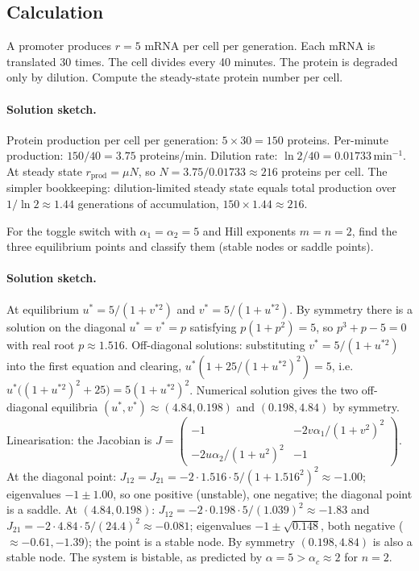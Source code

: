 \subsection*{Calculation}

\begin{exercise}
A promoter produces $r = 5$ mRNA per cell per generation. Each mRNA
is translated $30$ times. The cell divides every 40 minutes. The
protein is degraded only by dilution. Compute the steady-state
protein number per cell.

\paragraph{Solution sketch.}
Protein production per cell per generation: $5 \times 30 = 150$
proteins. Per-minute production: $150/40 = 3.75$ proteins/min.
Dilution rate: $\ln 2 / 40 = 0.01733\,\text{min}^{-1}$. At
steady state $r_{\text{prod}} = \mu N$, so $N = 3.75/0.01733 \approx
216$ proteins per cell. The simpler bookkeeping: dilution-limited
steady state equals total production over $1/\ln 2 \approx 1.44$
generations of accumulation, $150 \times 1.44 \approx 216$.
\end{exercise}

\begin{exercise}
For the toggle switch with $\alpha_1 = \alpha_2 = 5$ and Hill
exponents $m = n = 2$, find the three equilibrium points and
classify them (stable nodes or saddle points).

\paragraph{Solution sketch.}
At equilibrium $u^{*} = 5/(1+v^{*2})$ and $v^{*} = 5/(1+u^{*2})$.
By symmetry there is a solution on the diagonal $u^{*} = v^{*} = p$
satisfying $p(1+p^{2}) = 5$, so $p^{3} + p - 5 = 0$ with real
root $p \approx 1.516$. Off-diagonal solutions: substituting
$v^{*} = 5/(1+u^{*2})$ into the first equation and clearing,
$u^{*}(1 + 25/(1+u^{*2})^{2}) = 5$, i.e.\
$u^{*}\big((1+u^{*2})^{2} + 25\big) = 5(1+u^{*2})^{2}$. Numerical
solution gives the two off-diagonal equilibria
$(u^{*}, v^{*}) \approx (4.84, 0.198)$ and $(0.198, 4.84)$ by
symmetry. Linearisation: the Jacobian is
$J = \begin{pmatrix}-1 & -2v\alpha_1/(1+v^{2})^{2} \\ -2u\alpha_2/(1+u^{2})^{2} & -1\end{pmatrix}$.
At the diagonal point: $J_{12} = J_{21} = -2 \cdot 1.516 \cdot 5/(1+1.516^{2})^{2} \approx -1.00$;
eigenvalues $-1 \pm 1.00$, so one positive (unstable), one negative;
the diagonal point is a saddle. At
$(4.84, 0.198)$: $J_{12} = -2 \cdot 0.198 \cdot 5/(1.039)^{2} \approx -1.83$ and
$J_{21} = -2 \cdot 4.84 \cdot 5/(24.4)^{2} \approx -0.081$;
eigenvalues $-1 \pm \sqrt{0.148}$, both negative ($\approx -0.61,
-1.39$); the point is a stable node. By symmetry $(0.198, 4.84)$
is also a stable node. The system is bistable, as predicted by
$\alpha = 5 > \alpha_{c} \approx 2$ for $n = 2$.
\end{exercise}

